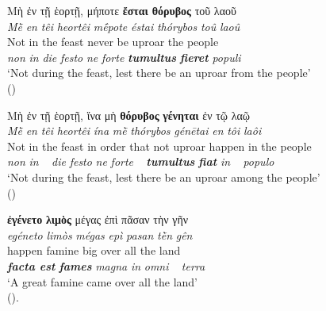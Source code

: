 \documentclass[output=paper,colorlinks,citecolor=brown]{langscibook}
\begin{document}
\z

\z

\ea\label{ex:bj:6}

\ea\label{ex:bj:6a}

\gllll Μὴ ἐν τῇ ἑορτῇ, μήποτε \textbf{ἔσται} \textbf{θόρυβος} τοῦ λαοῦ\\
 \textit{Mḕ} \textit{en} \textit{têi} \textit{heortêi} \textit{mḗpote} \textit{éstai} \textit{thórybos} \textit{toû} \textit{laoû}\\
Not in the feast never be uproar the people\\
\emph{non} \emph{in} \emph{die} \emph{festo} \emph{ne} \emph{forte} \textbf{\itshape
  tumultus} \textbf{\itshape fieret} \emph{populi}\\
\glt `Not during the feast, lest there be an uproar from the people' \\
\hspace*{\fill}()

\ex\label{ex:bj:6b}

\gllll Μὴ ἐν τῇ ἑορτῇ, ἵνα μὴ \textbf{θόρυβος} \textbf{γένηται} ἐν τῷ λαῷ\\
 \textit{Mḕ} \textit{en} \textit{têi} \textit{heortêi} \textit{ína} \textit{mḕ} \textit{thórybos} \textit{génētai} \textit{en} \textit{tôi} \textit{laôi}\\
Not in the feast {in order that} not uproar happen in the people\\
\emph{non} \emph{in} ~ {\emph{die} \emph{festo}} {\emph{ne} \emph{forte}} ~ \textbf{\itshape
  tumultus} \textbf{\itshape fiat} \emph{in} ~  \emph{populo}\\
\glt `Not during the feast, lest there be an uproar among the people' \\
\hspace*{\fill}()

\ex\label{ex:bj:6c}

\gllll \textbf{ἐγένετο} \textbf{λιμὸς} μέγας ἐπὶ πᾶσαν τὴν γῆν\\
 \textit{egéneto} \textit{limòs} \textit{mégas} \textit{epì} \textit{pasan} \textit{tḕn} \textit{gên}\\
happen famine big over all the land\\
\textbf{\itshape facta est} \emph{\bfseries fames} \emph{magna} \emph{in} \emph{omni} ~ \emph{terra}\\
\glt `A great famine came over all the land' \\
\hspace*{\fill}().
\end{document}
